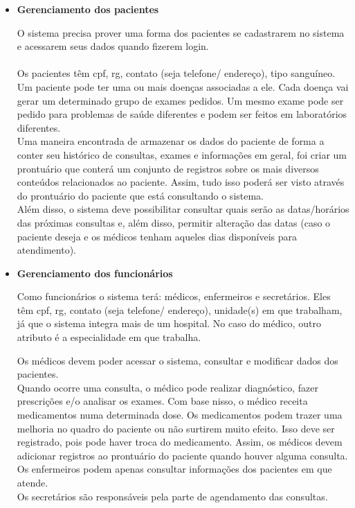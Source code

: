 \documentclass[12pt,a4paper]{report}
\begin{document}
\begin{itemize}
\item \textbf{Gerenciamento dos pacientes}

O sistema precisa prover uma forma dos pacientes se cadastrarem no sistema e acessarem seus dados quando fizerem login.\\
\\ Os pacientes têm cpf, rg, contato (seja telefone/ endereço), tipo sanguíneo.
Um paciente pode ter uma ou mais doenças associadas a ele. Cada doença vai gerar um determinado grupo de exames pedidos. Um mesmo exame pode ser pedido para problemas de saúde diferentes e podem ser feitos em laboratórios diferentes.\\
Uma maneira encontrada de armazenar os dados do paciente de forma a conter seu histórico de consultas, exames e informações em geral, foi criar um prontuário que conterá um conjunto de registros sobre os mais diversos conteúdos relacionados ao paciente. 
Assim, tudo isso poderá ser visto através do prontuário do paciente que está consultando o sistema. \\
Além disso, o sistema deve possibilitar consultar quais serão as datas/horários das próximas consultas e, além disso, permitir alteração das datas (caso o paciente deseja e os médicos tenham aqueles dias disponíveis para atendimento).

\item \textbf{Gerenciamento dos funcionários}

Como funcionários o sistema terá: médicos, enfermeiros e secretários.
Eles têm cpf, rg, contato (seja telefone/ endereço), unidade(s) em que trabalham, já que o sistema integra mais de um hospital.
No caso do médico, outro atributo é a especialidade em que trabalha.

Os médicos devem poder acessar o sistema, consultar e modificar dados dos pacientes. \\
Quando ocorre uma consulta, o médico pode realizar diagnóstico, fazer prescrições e/o analisar os exames. Com base nisso, o médico receita medicamentos numa determinada dose. Os medicamentos podem trazer uma melhoria no quadro do paciente ou não surtirem muito efeito. Isso deve ser registrado, pois pode haver troca do medicamento. Assim, os médicos devem adicionar registros ao prontuário do paciente quando houver alguma consulta. \\


Os enfermeiros podem apenas consultar informações dos pacientes em que atende. \\
Os secretários são responsáveis pela parte de agendamento das consultas.

\end{itemize}
\end{document}
